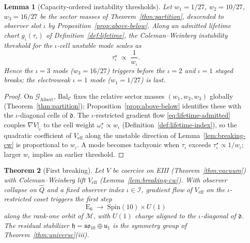 \documentclass[11pt]{article}
\theoremstyle{plain}
\newtheorem{theorem}{Theorem}[section]
\newtheorem{lemma}[theorem]{Lemma}
\theoremstyle{definition}
\theoremstyle{remark}
\numberwithin{equation}{section}
\newcommand{\E}[1]{\mathrm{E}_{#1}}
\newcommand{\Spin}{\mathrm{Spin}}
\begin{document}
\begin{lemma}[Capacity-ordered instability thresholds]
\label{lem:breaking-capacity-order}
Let $w_1=1/27$, $w_2=10/27$, $w_3=16/27$ be the sector masses of
Theorem~\ref{thm:partition}, descended to observer slot $\iota$ by
Proposition~\ref{prop:above-below}. Along an admitted lifetime chart
$g_\iota(\tau_\iota)$ of Definition~\ref{def:lifetime}, the Coleman--Weinberg
instability threshold for the $\iota$-cell unstable mode scales as
\begin{equation}\label{eq:breaking-threshold}
  \tau_\iota^\star \;\propto\; \frac{1}{w_\iota}.
\end{equation}
Hence the $\iota=3$ mode ($w_3=16/27$) triggers before the $\iota=2$ and
$\iota=1$ staged breaks; the electroweak $\iota=1$ mode ($w_1=1/27$) is last.
\end{lemma}

\begin{proof}
On $\mathcal{G}_{\mathrm{Albert}}$, $\mathrm{Bal}_{\mathcal{C}}$ fixes the
relative sector masses $(w_1,w_2,w_3)$ globally (Theorem~\ref{thm:partition});
Proposition~\ref{prop:above-below} identifies these with the $\iota$-diagonal
cells of $\mathfrak{d}$. The $\iota$-restricted gradient flow
\eqref{eq:lifetime-admitted} couples $\nabla V|_\iota$ to the cell weight
$\omega^\star_\iota\propto w_\iota$ (Definition~\ref{def:lifetime-index}), so
the quadratic coefficient of $V_{\mathrm{eff}}$ along the unstable direction
of Lemma~\ref{lem:breaking-cw} is proportional to $w_\iota$. A mode becomes
tachyonic when $\tau_\iota$ exceeds $\tau_\iota^\star\propto 1/w_\iota$; larger
$w_\iota$ implies an earlier threshold.
\end{proof}

\begin{theorem}[First breaking]\label{thm:breaking-e6so10}
Let $V$ be coercive on EIII (Theorem~\ref{thm:vacuum}) with Coleman--Weinberg
lift $V_{\mathrm{eff}}$ (Lemma~\ref{lem:breaking-cw}). With observer collapse on
$\hat Q$ and a fixed observer index $\iota\in\mathcal{I}$, gradient flow of
$V_{\mathrm{eff}}$ on the $\iota$-restricted coset triggers the first step
\begin{equation}\label{eq:breaking-e6so10}
  \E{6}\;\longrightarrow\; \Spin(10)\times U(1)
\end{equation}
along the rank-one orbit of $\mathcal{M}$, with $U(1)$ charge aligned to the
$\iota$-diagonal of $\mathfrak{d}$. The residual stabilizer
$\mathfrak{h}=\mathfrak{so}_{10}\oplus\mathfrak{u}_1$ is the symmetry group of
Theorem~\ref{thm:universe}(iii).
\end{theorem}
\end{document}
